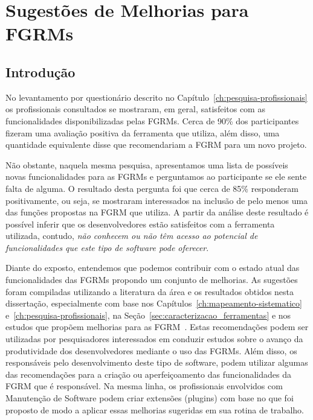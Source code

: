\chapter{Sugestões de Melhorias para FGRMs}
\label{ch:sug_melhoria}

\section{Introdução}
\label{sec:sug_melhoria_intro}

No levantamento por questionário descrito no
Capítulo~\ref{ch:pesquisa-profissionais} os profissionais consultados se
mostraram, em geral, satisfeitos com as funcionalidades disponibilizadas pelas
FGRMs. Cerca de 90\% dos par\-ti\-ci\-pan\-tes fizeram uma avaliação positiva da
ferramenta que utiliza, além disso, uma quantidade equivalente disse que
recomendariam a FGRM para um novo projeto.

Não obstante, naquela mesma pesquisa, apresentamos uma lista de possíveis novas
funcionalidades para as FGRMs e perguntamos ao participante se ele sente falta
de alguma. O resultado desta pergunta foi que cerca de 85\% responderam
positivamente, ou seja, se mostraram interessados na inclusão de pelo menos uma
das funções propostas na FGRM que utiliza. A partir da análise deste resultado é
possível inferir que os desenvolvedores estão satisfeitos com a ferramenta
utilizada, contudo, \textit{não conhecem ou não têm acesso ao potencial de
    funcionalidades que este tipo de software pode oferecer}.

Diante do exposto, entendemos que podemos contribuir com o estado a\-tu\-al das
funcionalidades das FGRMs propondo um conjunto de melhorias. As sugestões foram
compiladas utilizando a literatura da área e os resultados obtidos nesta
dissertação, especialmente com base nos
Capítulos~\ref{ch:mapeamento-sistematico} e~\ref{ch:pesquisa-profissionais}, na
Seção~\ref{sec:caracterizacao_ferramentas} e nos estudos que propõem melhorias
para as FGRM~\cite{zimmermann2009improving, bettenburg2008makes, singh2011bug}.
Estas recomendações podem ser utilizadas por pesquisadores interessados em
conduzir estudos sobre o avanço da produtividade dos desenvolvedores mediante o
uso das FGRMs. Além disso, os responsáveis pelo desenvolvimento deste tipo de
software, podem utilizar algumas das recomendações para a criação ou
aperfeiçoamento das funcionalidades da FGRM que é responsável. Na mesma linha,
os profissionais envolvidos com Manutenção de Software podem criar extensões
(plugins) com base no que foi proposto de modo a aplicar essas melhorias
sugeridas em sua rotina de trabalho.


